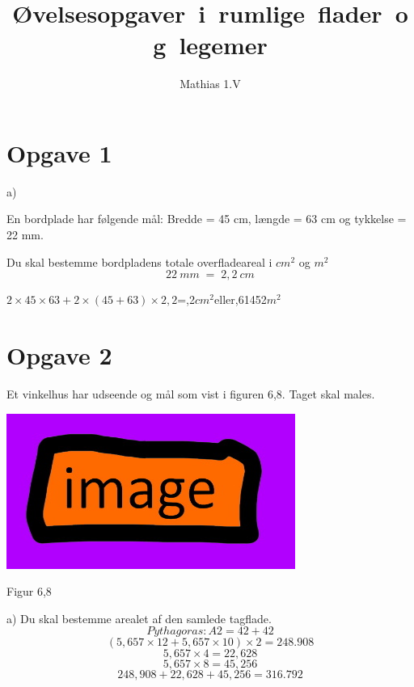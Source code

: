 \documentclass[]{article}
\title{\mbox{\textbf{Øvelsesopgaver i rumlige flader og legemer}}}
\author{Mathias 1.V}
\begin{document}
\maketitle
\thispagestyle{empty}
\section*{Opgave 1}
\textnormal{a)}
\hspace{1.1em}\parbox[t]{\linegoal}{En bordplade har følgende mål: Bredde = 45 cm, længde = 63 cm og tykkelse = 22 mm.\\}
\newline
Du skal bestemme bordpladens totale overfladeareal i $cm^{2}$ og $m^{2}$
\[22\:mm\;=\;2,2\:cm\]
\begin{center}
$2\times45\times63+2\times(45+63)\times2,2$\;\;=\;,2\:$cm^{2}$\:eller,61452\:$m^{2}$
\end{center}
\section*{Opgave 2}
Et vinkelhus har udseende og mål som vist i figuren 6,8. Taget skal males.
\begin{center}
\includegraphics{image.jpg}
\end{center}
\begin{flushright}
Figur 6,8
\end{flushright}
a) \hspace {1.1em} Du skal bestemme arealet af den samlede tagflade. \\
\[Pythagoras: A2 = 42 + 42\]
\[(5,657\times12 + 5,657\times10)\times2 = 248.908\]
\[5,657\times4 = 22,628\]
\[5,657\times8 = 45,256\]
\vspace {0em}
\[248,908 + 22,628 + 45,256 = 316.792\]
\end{document}
